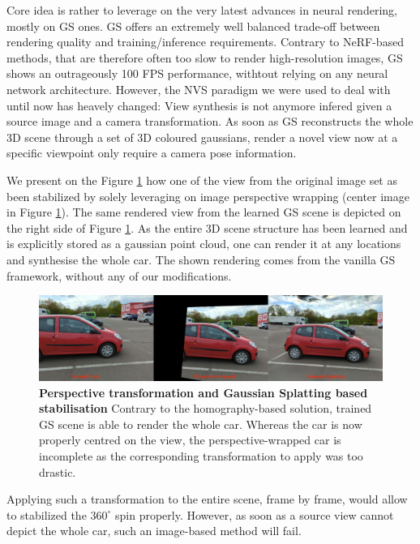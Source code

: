 Core idea is rather to leverage on the very latest advances in neural rendering, mostly on \ac{GS} ones. \ac{GS} offers an extremely well balanced trade-off between rendering quality and training/inference requirements. Contrary to \ac{NeRF}-based methods, that are therefore often too slow to render high-resolution images, \ac{GS} shows an outrageously 100 \ac{FPS} performance, withtout relying on any neural network architecture. However, the \ac{NVS} paradigm we were used to deal with until now has heavely changed: View synthesis is not anymore infered given a source image and a camera transformation. As soon as \ac{GS} reconstructs the whole 3D scene through a set of 3D coloured gaussians, render a novel view now at a specific viewpoint only require a camera pose information.

We present on the Figure \ref{fig:gs-vs-homography-view3} how one of the view from the original image set as been stabilized by solely leveraging on image perspective wrapping (center image in Figure \ref{fig:gs-vs-homography-view3}). The same rendered view from the learned \ac{GS} scene is depicted on the right side of Figure \ref{fig:gs-vs-homography-view3}. As the entire 3D scene structure has been learned and is explicitly stored as a gaussian point cloud, one can render it at any locations and synthesise the whole car. The shown rendering comes from the vanilla \ac{GS} framework, without any of our modifications.

\begin{figure}[htb!]
  \center
\includegraphics[width=\linewidth]{images/gaussiansplatting/perspective-vs-gs.png}
\caption{\textbf{Perspective transformation and Gaussian Splatting based stabilisation} Contrary to the homography-based solution, trained GS scene is able to render the whole car. Whereas the car is now properly centred on the view, the perspective-wrapped car is incomplete as the corresponding transformation to apply was too drastic.}
\label{fig:gs-vs-homography-view3}
\end{figure}

Applying such a transformation to the entire scene, frame by frame, would allow to stabilized the $360^{\circ}$ spin properly. However, as soon as a source view cannot depict the whole car, such an image-based method will fail. 

